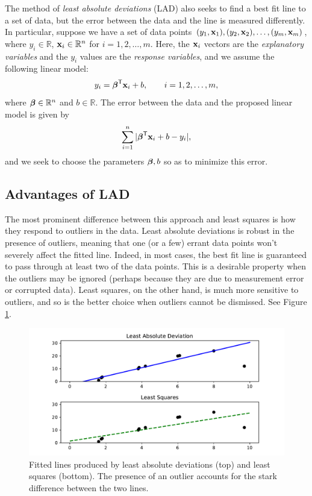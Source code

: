 The method of \emph{least absolute deviations} (LAD) also seeks to find a best fit line to a set of data, but the error between the data and the line is measured differently.
In particular, suppose we have a set of data points $(y_1, \mathbf{x}_1), (y_2, \mathbf{x}_2), \ldots, (y_m, \mathbf{x}_m)$, where $y_i \in \mathbb{R}$, $\mathbf{x}_i \in \mathbb{R}^n$ for $i = 1, 2, \ldots, m$.
Here, the $\mathbf{x}_i$ vectors are the \emph{explanatory variables} and the $y_i$ values are the \emph{response variables}, and we assume the following linear model:
\[
y_i = \boldsymbol{\beta}^{\mathsf T} \mathbf{x}_i + b, \qquad i = 1, 2, \ldots, m,
\]
where $\boldsymbol{\beta}\in\mathbb{R}^n$ and $b \in \mathbb{R}$.
The error between the data and the proposed linear model is given by
\[
\sum_{i=1}^n |\boldsymbol{\beta}^{\mathsf T} \mathbf{x}_i + b - y_i|,
\]
and we seek to choose the parameters $\boldsymbol{\beta}, b$ so as to minimize this error.

\subsection*{Advantages of LAD}
The most prominent difference between this approach and least squares is how they respond to outliers in the data.
Least absolute deviations is robust in the presence of outliers, meaning that one (or a few) errant data points won't severely affect the fitted line.
Indeed, in most cases, the best fit line is guaranteed to pass through at least two of the data points.
This is a desirable property when the outliers may be ignored (perhaps because they are due to measurement error or corrupted data).
Least squares, on the other hand, is much more sensitive to outliers, and so is the better choice when outliers cannot be dismissed.
See Figure \ref{fig:leastAbsDev}.

\begin{figure}
\centering
\includegraphics[width=\textwidth]{figures/leastAbsDev.pdf}
\caption{Fitted lines produced by least absolute deviations (top) and least squares (bottom). The presence of an outlier accounts for the
stark difference between the two lines.}
\label{fig:leastAbsDev}
\end{figure}

